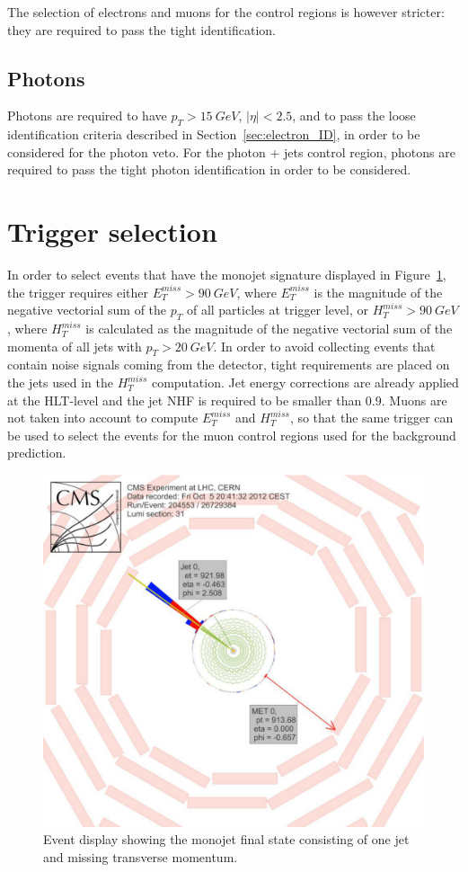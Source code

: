 The selection of electrons and muons for the control regions is however stricter: they are required to pass the tight identification.

\subsection{Photons}

Photons are required to have $p_T > \SI{15}{GeV}$, $|\eta| < 2.5$, and to pass the loose identification criteria described in Section~\ref{sec:electron_ID}, in order to be considered for the photon veto. For the photon + jets control region, photons are required to pass the tight photon identification in order to be considered.


\section{Trigger selection}
\label{sec:monojet_trigger}

In order to select events that have the monojet signature displayed in Figure~\ref{fig:monojet_display}, the trigger requires either $E_T^{miss} > \SI{90}{GeV}$, where $E_T^{miss}$ is the magnitude of the negative vectorial sum of the $p_T$ of all particles at trigger level, or $H_T^ {miss} > \SI{90}{GeV}$, where $H_T^{miss}$ is calculated as the magnitude of the negative vectorial sum of the momenta of all jets with $p_T > \SI{20}{GeV}$. In order to avoid collecting events that contain noise signals coming from the detector, tight requirements are placed on the jets used in the $H_T^{miss}$ computation. Jet energy corrections are already applied at the \ac{HLT}-level and the jet NHF is required to be smaller than 0.9. Muons are not taken into account to compute $E_T^{miss}$ and $H_T^{miss}$, so that the same trigger can be used to select the events for the muon control regions used for the background prediction.

\begin{figure}[ht]
  \centering
 \includegraphics[width=.6\textwidth]{monojet_event.pdf} 
 \caption{Event display showing the monojet final state consisting of one jet and missing transverse momentum.}
 \label{fig:monojet_display}
\end{figure}

